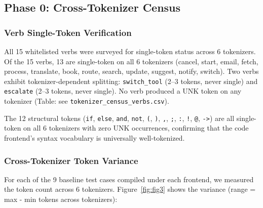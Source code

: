 \documentclass{article}
\begin{document}
\subsection{Phase 0: Cross-Tokenizer Census}\label{phase-0-cross-tokenizer-census}



\subsubsection{Verb Single-Token Verification}\label{verb-single-token-verification}



All 15 whitelisted verbs were surveyed for single-token status across 6 tokenizers. Of the 15 verbs, 13 are single-token on all 6 tokenizers (cancel, start, email, fetch, process, translate, book, route, search, update, suggest, notify, switch). Two verbs exhibit tokenizer-dependent splitting: \texttt{switch\_tool} (2--3 tokens, never single) and \texttt{escalate} (2--3 tokens, never single). No verb produced a UNK token on any tokenizer (Table: see \texttt{tokenizer\_census\_verbs.csv}).



The 12 structural tokens (\texttt{if}, \texttt{else}, \texttt{and}, \texttt{not}, \texttt{(}, \texttt{)}, \texttt{,}, \texttt{;}, \texttt{:}, \texttt{!}, \texttt{@}, \texttt{->}) are all single-token on all 6 tokenizers with zero UNK occurrences, confirming that the code frontend's syntax vocabulary is universally well-tokenized.



\subsubsection{Cross-Tokenizer Token Variance}\label{cross-tokenizer-token-variance}



For each of the 9 baseline test cases compiled under each frontend, we measured the token count across 6 tokenizers. Figure~\ref{fig:fig3} shows the variance (range = max - min tokens across tokenizers):
\end{document}
